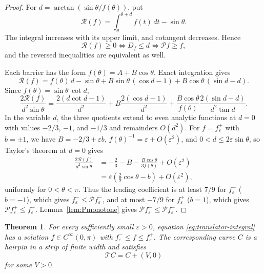 \documentclass[11pt]{article}
\numberwithin{equation}{section}
\newtheorem{theorem}{Theorem}[section]
\newcommand{\Tmap}{\mathcal T}
\newcommand{\eps}{\varepsilon}
\begin{document}
\begin{proof}
For \(d=\arctan(\sin\theta/f(\theta))\), put
\[
  \mathcal R(f)=\int_\theta^{\theta+d}f(t)\,dt-\sin\theta.
\]
The integral increases with its upper limit, and cotangent decreases. Hence
\[
  \mathcal R(f)\geq0\iff D_f\leq d\iff\mathcal P f\geq f,
\]
and the reversed inequalities are equivalent as well.

Each barrier has the form \(f(\theta)=A+B\cos\theta\). Exact integration
gives
\[
  \mathcal R(f)=f(\theta)\,d-\sin\theta
  +B\sin\theta\,(\cos d-1)+B\cos\theta\,(\sin d-d).
\]
Since \(f(\theta)=\sin\theta\,\cot d\),
\[
  \frac{2\mathcal R(f)}{d^2\sin\theta}
  =\frac{2(d\cot d-1)}{d^2}
   +B\frac{2(\cos d-1)}{d^2}
   +\frac{B\cos\theta}{f(\theta)}
        \frac{2(\sin d-d)}{d^2\tan d}.
\]
In the variable \(d\), the three quotients extend to even analytic functions at
\(d=0\) with values \(-2/3\), \(-1\), and \(-1/3\) and remainders \(O(d^2)\).
For \(f=f_\eps^\pm\) with \(b=\pm1\), we have \(B=-2/3+\eps b\),
\(f(\theta)^{-1}=\eps+O(\eps^2)\), and \(0<d\leq 2\eps\sin\theta\), so
Taylor's theorem at \(d=0\) gives
\[
\begin{aligned}
  \frac{2\mathcal R(f)}{d^2\sin\theta}
  &=-\frac23-B-\frac{B\cos\theta}{3f(\theta)}+O(\eps^2)\\
  &=\eps\left(\frac29\cos\theta-b\right)+O(\eps^2),
\end{aligned}
\]
uniformly for \(0<\theta<\pi\). Thus the leading coefficient is at least
\(7/9\) for \(f_\eps^-\) (\(b=-1\)), which gives
\(f_\eps^-\leq\mathcal P f_\eps^-\), and at most \(-7/9\) for \(f_\eps^+\)
(\(b=1\)), which gives \(\mathcal P f_\eps^+\leq f_\eps^+\).
Lemma~\ref{lem:Pmonotone} gives \(\mathcal P f_\eps^-\leq\mathcal P f_\eps^+\).
\end{proof}

\begin{theorem}\label{thm:hairpin}
For every sufficiently small \(\eps>0\), equation
\eqref{eq:translator-integral} has a solution \(f\in C^\infty(0,\pi)\)
with \(f_\eps^-\leq f\leq f_\eps^+\). The corresponding curve \(C\) is a
hairpin in a strip of finite width and satisfies
\[
  \Tmap C=C+(V,0)
\]
for some \(V>0\).
\end{theorem}
\end{document}
